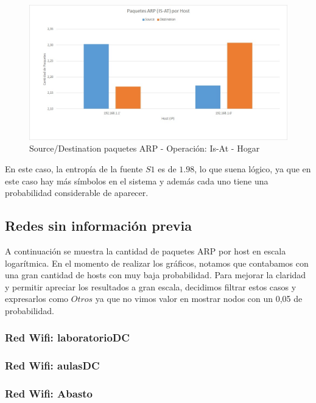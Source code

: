 \begin{figure}[h!]
\centering
\includegraphics[scale=0.5]{./img/arp_isAt_casa.jpg}
\caption{Source/Destination paquetes ARP - Operación: Is-At - Hogar}
\end{figure}

En este caso, la entropía de la fuente $S1$ es de $1.98$, lo que suena lógico, ya que en este caso hay más símbolos en el sistema y además cada uno tiene una probabilidad considerable de aparecer.

\subsection{Redes sin información previa}
A continuación se muestra la cantidad de paquetes ARP por host en escala logarítmica. 
En el momento de realizar los gráficos, notamos que contabamos con una gran cantidad de hosts con muy baja probabilidad. 
Para mejorar la claridad y permitir apreciar los resultados a gran escala, decidimos filtrar estos casos y expresarlos como $Otros$ ya que 
no vimos valor en mostrar nodos con un 0,05 de probabilidad.\\

\subsubsection{Red Wifi: laboratorioDC}


\newpage
\subsubsection{Red Wifi: aulasDC}


\newpage
\subsubsection{Red Wifi: Abasto}
